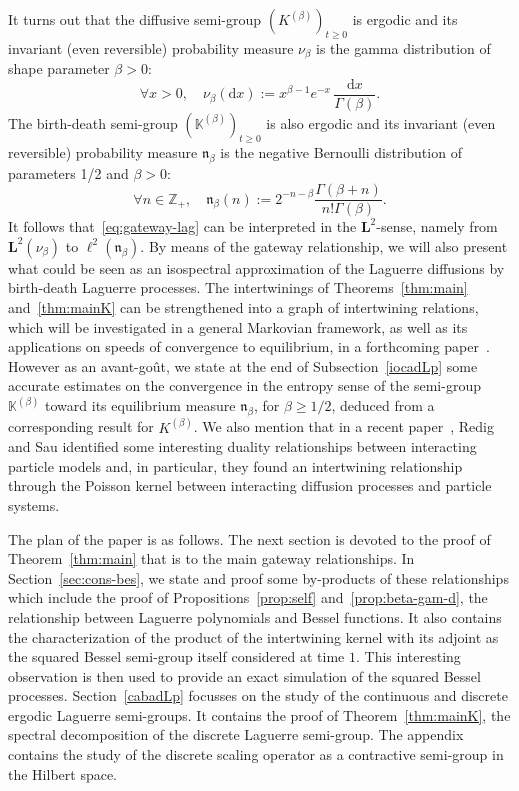 \documentclass[AHL,Unicode,longabstracts]{cedram}
\newcommand{\df}{\mathrel{:=}}
\newcommand{\ZZ}{\mathbb{Z}}
\newcommand{\fn}{\mathfrak{n}}
\newcommand{\dLs}{{\discret{K}}}
\newcommand{\Ls}{K}
\newcommand{\esL}{\mathbf{L}}
\newcommand{\discret}[1]{\mathds{#1}}
\let\oldforall\forall
\renewcommand*{\forall}{\mathrel{\oldforall}}
\newcommand*{\dd}{\mathrm{d}}
\newcommand*{\dx}{\dd x}
\begin{document}
It turns out that the diffusive semi-group $(\Ls^{(\beta)})_{t\geq 0}$ is ergodic and its invariant (even reversible) probability measure $\nu_\beta$ is the gamma distribution of shape parameter $\beta>0$:
\[
\forall x>0,\quad\nu_\beta(\dx)\df x^{\beta-1}e^{-x}\, \frac{\dx}{\Gamma(\beta)}.
\]
The birth-death semi-group $(\dLs^{(\beta)})_{t\geq 0}$ is also ergodic and its invariant (even reversible) probability measure $\fn_\beta$ is the negative Bernoulli distribution of parameters 1/2 and $\beta>0$:
\[
\forall n\in\ZZ_+,\quad \fn_\beta(n)\df 2^{-n-\beta}\frac{\Gamma(\beta+n)}{n!\Gamma(\beta)}.
\]
It follows that~\eqref{eq:gateway-lag} can be interpreted in the $\esL^2$-sense, namely from $\esL^2(\nu_\beta)$ to $\ell^2(\fn_\beta)$. By means of the gateway relationship, we will also present what could be seen as an isospectral approximation of the Laguerre diffusions by birth-death Laguerre processes. The intertwinings of Theorems~\ref{thm:main} and~\ref{thm:mainK} can be strengthened into a graph of intertwining relations, which will be investigated in a general Markovian framework, as well as its applications on speeds of convergence to equilibrium, in a forthcoming paper~\cite{intertwining}. However as an avant-go\^ut, we state at the end of Subsection~\ref{iocadLp} some accurate estimates on the convergence in the entropy sense of the semi-group $\dLs^{(\beta)}$ toward its equilibrium measure $\fn_\beta$, for $\beta\geq 1/2$, deduced from a corresponding result for $\Ls^{(\beta)}$. We also mention that in a recent paper~\cite{Redig}, Redig and Sau identified some interesting duality relationships between interacting particle models and, in particular, they found an intertwining relationship through the Poisson kernel between interacting diffusion processes and particle systems.

The plan of the paper is as follows. The next section is devoted to the proof of Theorem~\ref{thm:main} that is to the main gateway relationships. In Section~\ref{sec:cons-bes}, we state and proof some by-products of these relationships which include the proof of Propositions~\ref{prop:self} and~\ref{prop:beta-gam-d}, the relationship between Laguerre polynomials and Bessel functions. It also contains the characterization of the product of the intertwining kernel with its adjoint as the squared Bessel semi-group itself considered at time $1$. This interesting observation is then used to provide an exact simulation of the squared Bessel processes. Section~\ref{cabadLp} focusses on the study of the continuous and discrete ergodic Laguerre semi-groups. It contains the proof of Theorem~\ref{thm:mainK}, the spectral decomposition of the discrete Laguerre semi-group. The appendix contains the study of the discrete scaling operator as a contractive semi-group in the Hilbert space.
\end{document}
